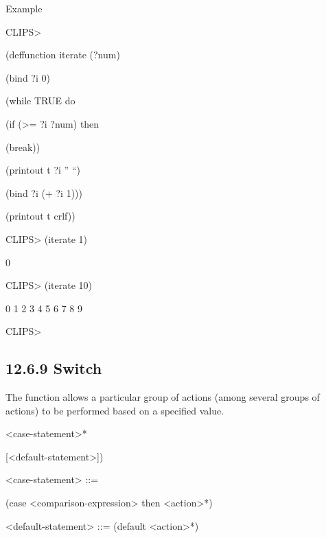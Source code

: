 \documentclass[letterpaper,10pt,english]{sphinxmanual}
\begin{document}

\begin{sphinxVerbatim}[commandchars=\\\{\}]
\end{sphinxVerbatim}

Example

CLIPS\textgreater{}

(deffunction iterate (?num)

(bind ?i 0)

(while TRUE do

(if (\textgreater{}= ?i ?num) then

(break))

(printout t ?i ” “)

(bind ?i (+ ?i 1)))

(printout t crlf))

CLIPS\textgreater{} (iterate 1)

0

CLIPS\textgreater{} (iterate 10)

0 1 2 3 4 5 6 7 8 9

CLIPS\textgreater{}


\subsection{12.6.9 Switch}
\label{\detokenize{actions:switch}}
The  function allows a particular group of actions (among
several groups of actions) to be performed based on a specified value.


\begin{sphinxVerbatim}[commandchars=\\\{\}]
 
\end{sphinxVerbatim}

\textless{}case-statement\textgreater{}*

{[}\textless{}default-statement\textgreater{}{]})

\textless{}case-statement\textgreater{} ::=

(case \textless{}comparison-expression\textgreater{} then \textless{}action\textgreater{}*)

\textless{}default-statement\textgreater{} ::= (default \textless{}action\textgreater{}*)
\end{document}
